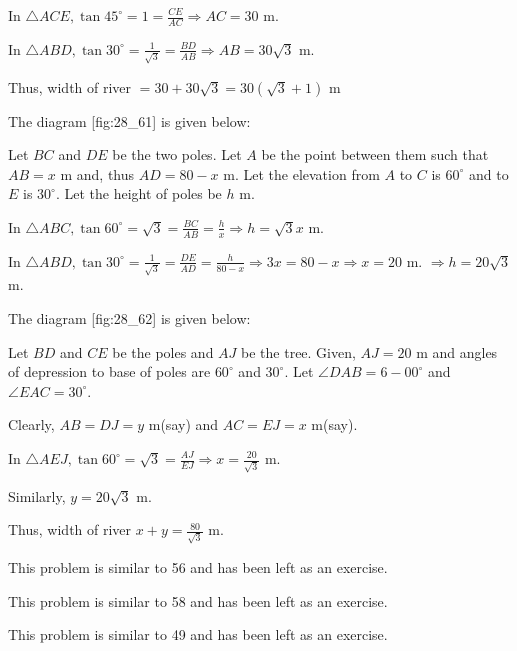   In $\triangle ACE, \tan45^\circ = 1 = \frac{CE}{AC} \Rightarrow AC = 30$ m.

  In $\triangle ABD, \tan30^\circ = \frac{1}{\sqrt{3}} = \frac{BD}{AB} \Rightarrow AB = 30\sqrt{3}$ m.

  Thus, width of river $= 30 + 30\sqrt{3} = 30(\sqrt{3} + 1)$ m

\item The diagram [fig:28_61] is given below:

  \startplacefigure[reference=fig:28_61]
    \externalfigure[28_61.pdf]
  \stopplacefigure

  Let $BC$ and $DE$ be the two poles. Let $A$ be the point between them such that $AB = x$ m and, thus
  $AD = 80 - x$ m. Let the elevation from $A$ to $C$ is $60^\circ$ and to $E$ is
  $30^\circ$. Let the height of poles be $h$ m.

  In $\triangle ABC, \tan60^\circ = \sqrt{3} = \frac{BC}{AB} = \frac{h}{x} \Rightarrow h = \sqrt{3}x$ m.

  In $\triangle ABD, \tan30^\circ = \frac{1}{\sqrt{3}} = \frac{DE}{AD} = \frac{h}{80 - x} \Rightarrow 3x = 80 -x
  \Rightarrow x = 20$ m. $\Rightarrow h = 20\sqrt{3}$ m.

\item The diagram [fig:28_62] is given below:

  \startplacefigure[reference=fig:28_62]
    \externalfigure[28_62.pdf]
  \stopplacefigure

  Let $BD$ and $CE$ be the poles and $AJ$ be the tree. Given, $AJ = 20$ m and angles of depression to
  base of poles are $60^\circ$ and $30^\circ$. Let $\angle DAB = 6-00^\circ$ and $\angle EAC = 30^\circ$.

  Clearly, $AB = DJ = y$ m(say) and $AC = EJ = x$ m(say).

  In $\triangle AEJ, \tan60^\circ = \sqrt{3} = \frac{AJ}{EJ} \Rightarrow x = \frac{20}{\sqrt{3}}$ m.

  Similarly, $y = 20\sqrt{3}$ m.

  Thus, width of river $x + y = \frac{80}{\sqrt{3}}$ m.

\item This problem is similar to 56 and has been left as an exercise.

\item This problem is similar to 58 and has been left as an exercise.

\item This problem is similar to 49 and has been left as an exercise.

